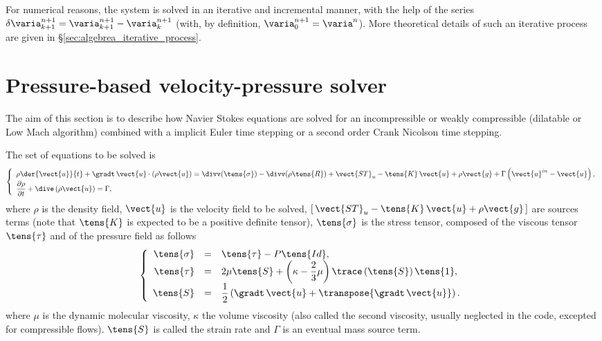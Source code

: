 For numerical reasons, the system is solved in an iterative and incremental
manner, with the help of the series $\delta \varia^{n+1}_{k+1}=\varia^{n+1}_{k+1}-\varia^{n+1}_{k}$
(with, by definition, $\varia^{n+1}_0=\varia^{n}$).
More theoretical details of such an iterative process are given in \S \ref{sec:algebrea_iterative_process}.

\section{Pressure-based velocity-pressure solver}
The aim of this section is to describe how Navier Stokes equations are solved for an incompressible
or weakly compressible (dilatable or Low Mach algorithm) combined with a
implicit Euler time stepping or a second order Crank Nicolson time stepping.

The set of equations to be solved is
\begin{equation}\label{eq:timstp:navier_stokes}
\left\{\begin{array}{l}
\displaystyle \rho \der{\vect{u}}{t} + \gradt \, \vect{u} \cdot \left( \rho\vect{u}  \right)
=\divv(\tens{\sigma}) - \divv(\rho \tens{R}) + \vect{ST}_u - \tens{K}\,\vect{u} + \rho \vect{g} + \Gamma \left( \vect{u}^{in} - \vect{u} \right), \\
\dfrac{\partial \rho}{\partial t} + \dive\left( \rho \vect{u} \right) = \Gamma ,
\end{array}\right.
\end{equation}
%
where $\rho$ is the density field, $\vect{u}$ is the velocity field to be solved,
$[\,\vect{ST}_u-\tens{K}\,\vect{u} + \rho \vect{g} \,]$  are sources terms (note that $\tens{K}$ is expected to be a positive definite tensor),
 $\tens{\sigma}$ is the stress tensor, composed of the viscous tensor $\tens{\tau}$ and of the pressure field as follows
\begin{equation}
\left\{\begin{array}{r c l}
\tens{\sigma} &=& \tens{\tau} - P\tens{Id} , \\%
\tens{\tau} & =& 2 \mu  \tens{S} +   \left( \kappa - \dfrac{2}{3}\mu \right)   \trace \left( \tens{S} \right) \tens{1} ,\\
\tens{S} &=& \dfrac{1}{2} \left( \gradt \, \vect{u}+\transpose{\gradt \, \vect{u}} \right) .
\end{array}\right.
\end{equation}
 where  $\mu$ is the dynamic molecular viscosity,
 $\kappa$ the volume viscosity (also called the second viscosity, usually neglected in the code, excepted for compressible flows).
$\tens{S}$ is called the strain rate and  $\Gamma$ is an eventual mass source term.

